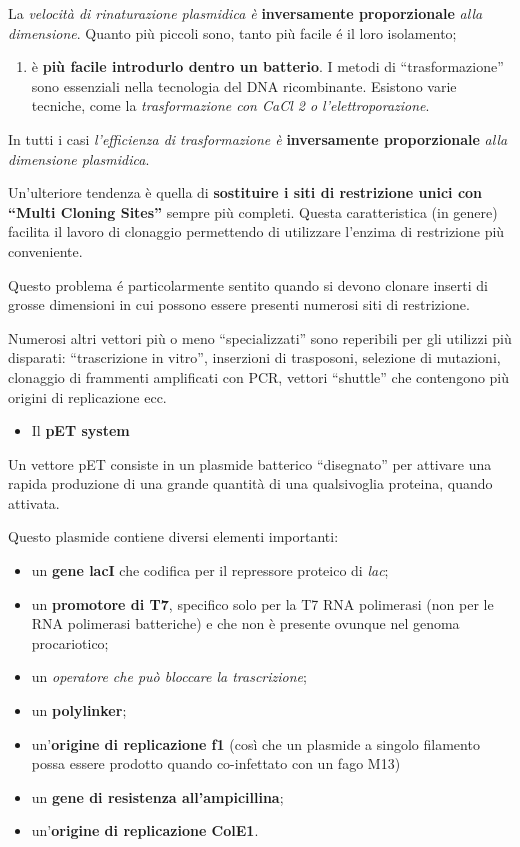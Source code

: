 \documentclass[]{article}
\begin{document}
La \emph{velocità di rinaturazione plasmidica è} \textbf{inversamente
proporzionale} \emph{alla dimensione}. Quanto più piccoli sono, tanto
più facile é il loro isolamento;

\begin{enumerate}
\def\labelenumi{\arabic{enumi}.}
\setcounter{enumi}{2}
\itemsep1pt\parskip0pt
\item
  è \textbf{più facile introdurlo dentro un batterio}. I metodi di
  ``trasformazione'' sono essenziali nella tecnologia del DNA
  ricombinante. Esistono varie tecniche, come la \emph{trasformazione
  con CaCl 2 o l'elettroporazione}.
\end{enumerate}

In tutti i casi \emph{l'efficienza di trasformazione è}
\textbf{inversamente proporzionale} \emph{alla dimensione plasmidica}.

Un'ulteriore tendenza è quella di \textbf{sostituire i siti di
restrizione unici con ``Multi Cloning Sites''} sempre più completi.
Questa caratteristica (in genere) facilita il lavoro di clonaggio
permettendo di utilizzare l'enzima di restrizione più conveniente.

Questo problema é particolarmente sentito quando si devono clonare
inserti di grosse dimensioni in cui possono essere presenti numerosi
siti di restrizione.

Numerosi altri vettori più o meno ``specializzati'' sono reperibili per
gli utilizzi più disparati: ``trascrizione in vitro'', inserzioni di
trasposoni, selezione di mutazioni, clonaggio di frammenti amplificati
con PCR, vettori ``shuttle'' che contengono più origini di replicazione
ecc.

\begin{itemize}
\itemsep1pt\parskip0pt
\item
  Il \textbf{pET system}
\end{itemize}

Un vettore pET consiste in un plasmide batterico ``disegnato'' per
attivare una rapida produzione di una grande quantità di una
qualsivoglia proteina, quando attivata.

Questo plasmide contiene diversi elementi importanti:

\begin{itemize}
\itemsep1pt\parskip0pt
\item
  un \textbf{gene lacI} che codifica per il repressore proteico di
  \emph{lac};
\item
  un \textbf{promotore di T7}, specifico solo per la T7 RNA polimerasi
  (non per le RNA polimerasi batteriche) e che non è presente ovunque
  nel genoma procariotico;
\item
  un \emph{operatore che può bloccare la trascrizione};
\item
  un \textbf{polylinker};
\item
  un'\textbf{origine di replicazione f1} (così che un plasmide a singolo
  filamento possa essere prodotto quando co-infettato con un fago M13)
\item
  un \textbf{gene di resistenza all'ampicillina};
\item
  un'\textbf{origine di replicazione ColE1}.
\end{itemize}
\end{document}
